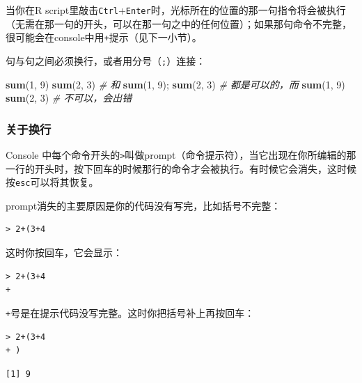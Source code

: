 \documentclass[]{book}
\newenvironment{Shaded}{\begin{snugshade}}{\end{snugshade}}
\newcommand{\CommentTok}[1]{\textcolor[rgb]{0.56,0.35,0.01}{\textit{#1}}}
\newcommand{\DecValTok}[1]{\textcolor[rgb]{0.00,0.00,0.81}{#1}}
\newcommand{\KeywordTok}[1]{\textcolor[rgb]{0.13,0.29,0.53}{\textbf{#1}}}
\newcommand{\NormalTok}[1]{#1}
\begin{document}
当你在R script里敲击\texttt{Ctrl}+\texttt{Enter}时，光标所在的位置的那一句指令将会被执行（无需在那一句的开头，可以在那一句之中的任何位置）；如果那句命令不完整，很可能会在console中用\texttt{+}提示（见下一小节）。

句与句之间必须换行，或者用分号（\texttt{;}）连接：

\begin{Shaded}
\begin{Highlighting}[]
\KeywordTok{sum}\NormalTok{(}\DecValTok{1}\NormalTok{, }\DecValTok{9}\NormalTok{)}
\KeywordTok{sum}\NormalTok{(}\DecValTok{2}\NormalTok{, }\DecValTok{3}\NormalTok{)}
\CommentTok{# 和}
\KeywordTok{sum}\NormalTok{(}\DecValTok{1}\NormalTok{, }\DecValTok{9}\NormalTok{); }\KeywordTok{sum}\NormalTok{(}\DecValTok{2}\NormalTok{, }\DecValTok{3}\NormalTok{)}
\CommentTok{# 都是可以的，而}
\KeywordTok{sum}\NormalTok{(}\DecValTok{1}\NormalTok{, }\DecValTok{9}\NormalTok{) }\KeywordTok{sum}\NormalTok{(}\DecValTok{2}\NormalTok{, }\DecValTok{3}\NormalTok{)}
\CommentTok{# 不可以，会出错}
\end{Highlighting}
\end{Shaded}

\hypertarget{newline}{%
\subsubsection{关于换行}\label{newline}}

Console 中每个命令开头的\texttt{\textgreater{}}叫做prompt（命令提示符），当它出现在你所编辑的那一行的开头时，按下回车的时候那行的命令才会被执行。有时候它会消失，这时候按\texttt{esc}可以将其恢复。

prompt消失的主要原因是你的代码没有写完，比如括号不完整：

\begin{verbatim}
> 2+(3+4
\end{verbatim}

这时你按回车，它会显示：

\begin{verbatim}
> 2+(3+4
+
\end{verbatim}

\texttt{+}号是在提示代码没写完整。这时你把括号补上再按回车：

\begin{verbatim}
> 2+(3+4
+ )
\end{verbatim}

\begin{verbatim}
[1] 9
\end{verbatim}
\end{document}
